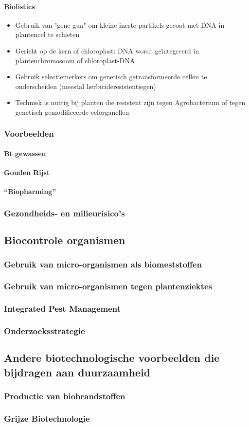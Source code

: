 \documentclass[a4paper,kul]{kulakarticle} %
\begin{document}
\paragraph{Biolistics}
\begin{itemize}
	\item Gebruik van "gene gun" om kleine inerte partikels
	gecoat met DNA in plantencel te schieten
	\item Gericht op de kern of chloroplast: DNA wordt
	geïntegreerd in plantenchromosoom of chloroplast-DNA
	\item Gebruik selectiemerkers om genetisch getransformeerde cellen te
	onderscheiden (meestal herbicideresistentiegen)
	\item Techniek is nuttig bij planten die resistent zijn
	tegen Agrobacterium of tegen genetisch
	gemodificeerde celorganellen
\end{itemize}
\subsubsection{Voorbeelden}
\paragraph{Bt gewassen}
\paragraph{Gouden Rijst}
\paragraph{“Biopharming”}
\subsubsection{Gezondheids- en milieurisico’s}
\subsection{Biocontrole organismen}
\subsubsection{Gebruik van micro-organismen als biomeststoffen}
\subsubsection{Gebruik van micro-organismen tegen plantenziektes}
\subsubsection{Integrated Pest Management}
\subsubsection{Onderzoeksstrategie}
\subsection{Andere biotechnologische voorbeelden die bijdragen aan duurzaamheid}
\subsubsection{Productie van biobrandstoffen}
\subsubsection{Grijze Biotechnologie}
\end{document}
